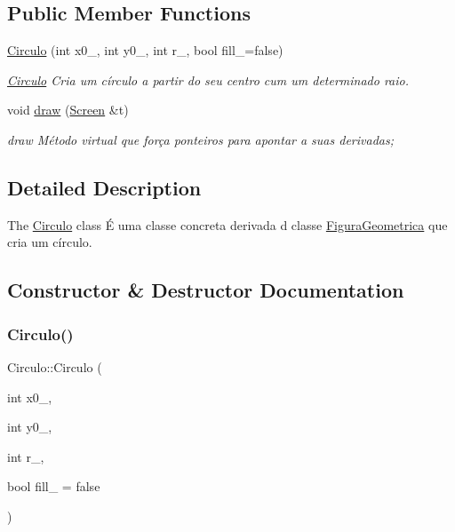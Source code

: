 \subsection*{Public Member Functions}
\begin{DoxyCompactItemize}
\item 
\hyperlink{class_circulo_a25ea8ad5025f200c8459e81048bd34c5}{Circulo} (int x0\+\_\+, int y0\+\_\+, int r\+\_\+, bool fill\+\_\+=false)
\begin{DoxyCompactList}\small\item\em \hyperlink{class_circulo}{Circulo} Cria um círculo a partir do seu centro cum um determinado raio. \end{DoxyCompactList}\item 
void \hyperlink{class_circulo_a593787d6e0618c2eded23e8839e7bea6}{draw} (\hyperlink{class_screen}{Screen} \&t)
\begin{DoxyCompactList}\small\item\em draw Método virtual que força ponteiros para apontar a suas derivadas; \end{DoxyCompactList}\end{DoxyCompactItemize}


\subsection{Detailed Description}
The \hyperlink{class_circulo}{Circulo} class É uma classe concreta derivada d classe \hyperlink{class_figura_geometrica}{Figura\+Geometrica} que cria um círculo. 

\subsection{Constructor \& Destructor Documentation}
\mbox{\label{class_circulo_a25ea8ad5025f200c8459e81048bd34c5}} 
\subsubsection{\texorpdfstring{Circulo()}{Circulo()}}
{\footnotesize\ttfamily Circulo\+::\+Circulo (\begin{DoxyParamCaption}\item[{int}]{x0\+\_\+,  }\item[{int}]{y0\+\_\+,  }\item[{int}]{r\+\_\+,  }\item[{bool}]{fill\+\_\+ = {\ttfamily false} }\end{DoxyParamCaption})}



